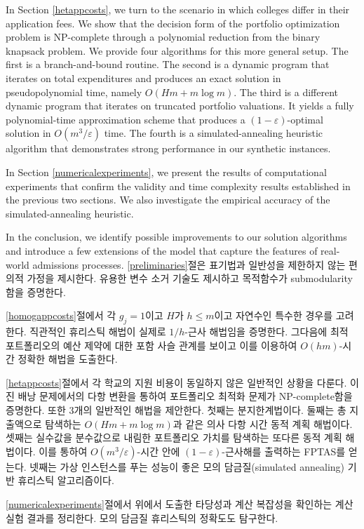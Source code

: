 \documentclass[11pt]{article} %
\theoremstyle{definition}
\theoremstyle{definition}
\begin{document}
In Section \ref{hetappcosts}, we turn to the scenario in which colleges differ in their application fees. We show that the decision form of the portfolio optimization problem is NP-complete through a polynomial reduction from the binary knapsack problem. We provide four algorithms for this more general setup. The first is a branch-and-bound routine. The second is a dynamic program that iterates on total expenditures and produces an exact solution in pseudopolynomial time, namely $O(Hm + m \log m)$. The third is a different dynamic program that iterates on truncated portfolio valuations. It yields a fully polynomial-time approximation scheme that produces a $(1 - \varepsilon)$-optimal solution in $O(m^3 / \varepsilon)$ time.  The fourth is a simulated-annealing heuristic algorithm that demonstrates strong performance in our synthetic instances. 

In Section \ref{numericalexperiments}, we present the results of computational experiments that confirm the validity and time complexity results established in the previous two sections. We also investigate the empirical accuracy of the simulated-annealing heuristic.

In the conclusion, we identify possible improvements to our solution algorithms and introduce a few extensions of the model that capture the features of real-world admissions processes.
\else
\ref{preliminaries}절은 표기법과 일반성을 제한하지 않는 편의적 가정을 제시한다. 유용한 변수 소거 기술도 제시하고 목적함수가 submodularity함을 
증명한다.
 
\ref{homogappcosts}절에서 각 $g_j = 1$이고 $H$가 $h \leq m$이고 자연수인 특수한 경우를 고려한다. 직관적인 휴리스틱 해법이 실제로 $1/h$-근사 해법임을 증명한다. 그다음에 최적 포트폴리오의 예산 제약에 대한 포함 사슬 관계를 보이고 이를 이용하여 $O(hm)$-시간 정확한 해법을 도출한다. 

\ref{hetappcosts}절에서 각 학교의 지원 비용이 동일하지 않은 일반적인 상황을 다룬다. 이진 배낭 문제에서의 다항 변환을 통하여 포트폴리오 최적화 문제가 NP-complete함을 증명한다. 또한 3개의 일반적인 해법을 제안한다. 첫째는 분지한계법이다. 둘째는 총 지출액으로 탐색하는 $O(Hm + m \log m)$과 같은 의사 다항 시간 동적 계획 해법이다. 셋째는 실수값을 분수값으로 내림한 포트폴리오 가치를 탐색하는 또다른 동적 계획 해법이다. 이를 통하여 $O(m^3 / \varepsilon)$-시간 안에 $(1 - \varepsilon)$-근사해를 출력하는 FPTAS를 얻는다. 넷째는 가상 인스턴스를 푸는 성능이 좋은 모의 담금질(simulated annealing) 기반 휴리스틱 알고리즘이다.

\ref{numericalexperiments}절에서 위에서 도출한 타당성과 계산 복잡성을 확인하는 계산 실험 결과를 정리한다. 모의 담금질 휴리스틱의 정확도도 탐구한다.
\end{document}
